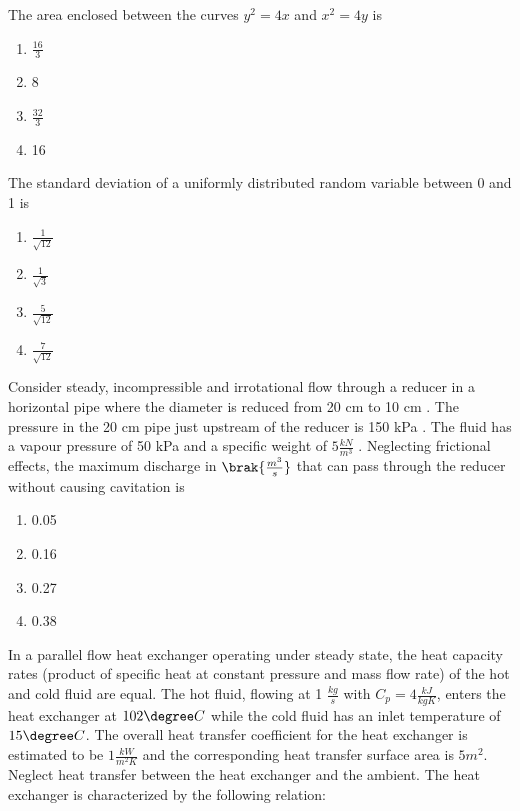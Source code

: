 \iffalse
\chapter{2009}
\author{AI24BTECH11033}
\section{me}
\fi

    \item The area enclosed between the curves $ y^2=4x $ and $ x^2=4y $ is
    \begin{enumerate}
    \item  $\frac{16}{3}$
    \item  8
    \item  $\frac{32}{3}$
    \item  16
  \end{enumerate}
  \item The standard deviation of a uniformly distributed random variable between 0 and 1 is
    \begin{enumerate}
    \item  $\frac{1}{\sqrt{12}}$
    \item  $\frac{1}{\sqrt{3}}$
    \item  $\frac{5}{\sqrt{12}}$
    \item  $\frac{7}{\sqrt{12}}$
  \end{enumerate}
  \item Consider steady, incompressible and irrotational flow through a reducer in a horizontal pipe where the diameter is reduced from 20 cm to 10 cm . The pressure in the 20 cm pipe just upstream of the reducer is 150 kPa . The fluid has a vapour pressure of 50 kPa  and a specific weight of $5 \frac{kN}{m^3}$ . Neglecting frictional effects, the maximum discharge in $\brak{\frac{m^3}{s}}$ that can pass through the reducer without causing cavitation is
   \begin{enumerate}
    \item  0.05
    \item  0.16
    \item  0.27
    \item  0.38
  \end{enumerate}
  \item In a parallel flow heat exchanger operating under steady state, the heat capacity rates (product of specific heat at constant pressure and mass flow rate) of the hot and cold fluid are equal. The hot fluid, flowing at 1 $\frac{kg}{s}$ with $C_p = 4  \frac{kJ}{kgK}$, enters the heat exchanger at $102\degree C$ while the cold fluid has an inlet temperature of $15\degree C$. The overall heat transfer coefficient for the heat exchanger is estimated to be $1 \frac{kW}{m^2K}$ and the corresponding heat transfer surface area is $5 m^2$. Neglect heat transfer between the heat exchanger and the ambient. The heat exchanger is characterized by the following relation:

